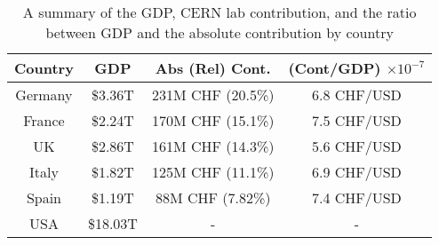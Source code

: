 \begin{center}
\begin{table}[]
\begin{center}
\caption{A summary of the GDP, CERN lab contribution, and the ratio between GDP and the absolute contribution 
by country}
\begin{tabular}{cccc}
\textbf{Country} & GDP & Abs (Rel) Cont. & (Cont/GDP) $\times 10^{-7}$ \\
\hline
Germany & \$3.36T  & 231M CHF (20.5\%) & 6.8 CHF/USD  \\
France  & \$2.24T  & 170M CHF (15.1\%) & 7.5 CHF/USD\\
UK      & \$2.86T  & 161M CHF (14.3\%) & 5.6 CHF/USD\\
Italy   & \$1.82T  & 125M CHF (11.1\%) & 6.9 CHF/USD\\
Spain   & \$1.19T  & 88M  CHF (7.82\%) & 7.4 CHF/USD\\
\hline
USA     & \$18.03T & -             & -     \\
\end{tabular}
\end{center}
\label{tab:gdpcontrib}
\end{table}
\end{center}
